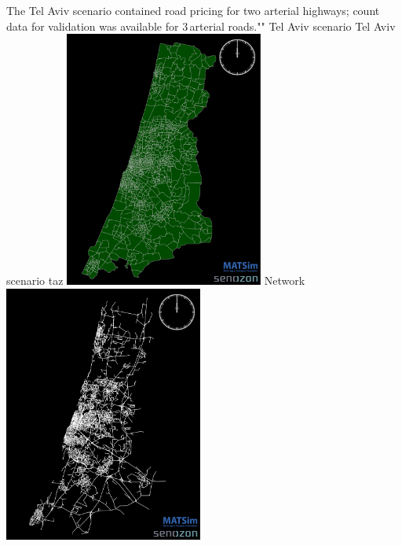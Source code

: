 The Tel Aviv scenario contained road pricing for two arterial highways; count data for validation was available for 3\,arterial roads.""
%
\createfigure%
{Tel Aviv scenario}%
{Tel Aviv scenario}%
{\label{fig:telavivscenario}}%
{%
  \createsubfigure%
  {\protect\gls{taz}}%
  {\includegraphics[width=0.49\textwidth,angle=0]{using/figures/TelAviv_TAZ}}%
  {\label{fig:TAZ}}%
  {}%
  \createsubfigure%
  {Network}%
	{\includegraphics[width=0.49\textwidth,angle=0]{using/figures/TelAviv_RoadNetwork}}%
  {\label{fig:network}}%
  {}%
}%
{}

